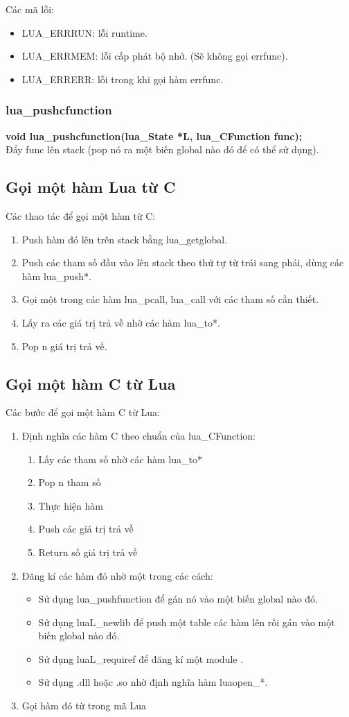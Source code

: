\documentclass[12pt]{article}
\begin{document}
Các mã lỗi:
\begin{itemize}
\item LUA\_ERRRUN: lỗi runtime.
\item LUA\_ERRMEM: lỗi cấp phát bộ nhớ. (Sẽ không gọi errfunc).
\item LUA\_ERRERR: lỗi trong khi gọi hàm errfunc.
\end{itemize}

\subsubsection{lua\_pushcfunction}
\textbf{void lua\_pushcfunction(lua\_State *L, lua\_CFunction func);} \\
Đẩy func lên stack (pop nó ra một biến global nào đó để có thể sử dụng).
\subsection{Gọi một hàm Lua từ C}
Các thao tác để gọi một hàm từ C: 
\begin{enumerate}
\item Push hàm đó lên trên stack bằng lua\_getglobal.
\item Push các tham số đầu vào lên stack theo thứ tự từ trái sang phải, dùng các hàm lua\_push*.
\item Gọi một trong các hàm lua\_pcall, lua\_call với các tham số cần thiết.
\item Lấy ra các giá trị trả về nhờ các hàm lua\_to*.
\item Pop n giá trị trả về.
\end{enumerate}
\subsection{Gọi một hàm C từ Lua}
Các bước để gọi một hàm C từ Lua:
\begin{enumerate}
\item Định nghĩa các hàm C theo chuẩn của lua\_CFunction:
	\begin{enumerate}
	\item Lấy các tham số nhờ các hàm lua\_to*
	\item Pop n tham số
	\item Thực hiện hàm
	\item Push các giá trị trả về
	\item Return số giá trị trả về
	\end{enumerate}
\item Đăng kí các hàm đó nhờ một trong các cách:
	\begin{itemize}
	\item Sử dụng lua\_pushfunction để gán nó vào một biến global nào đó.
	\item Sử dụng luaL\_newlib để push một table các hàm lên rồi gán vào một biến global nào đó.
	\item Sử dụng luaL\_requiref để đăng kí một module .
	\item Sử dụng .dll hoặc .so nhờ định nghĩa hàm luaopen\_*.
	\end{itemize}
\item Gọi hàm đó từ trong mã Lua
\end{enumerate}
\end{document}
